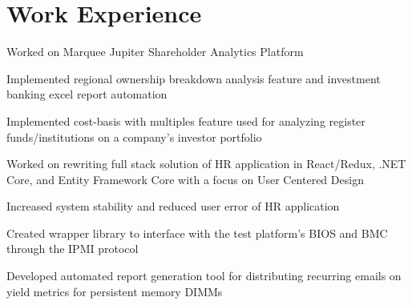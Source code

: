 \documentclass[]{deedy-resume-openfont}
\begin{document}
\hfill
\begin{minipage}[t]{0.66\textwidth} 


\section{Work Experience}

\sectionsep

\vspace{\topsep} %
\begin{tightemize}\item Worked on Marquee Jupiter Shareholder Analytics Platform \item Implemented regional ownership breakdown analysis feature and investment banking excel report automation \item Implemented cost-basis with multiples feature used for analyzing register funds/institutions on a company's investor portfolio 
\end{tightemize}
\sectionsep

\begin{tightemize}\item Worked on rewriting full stack solution of HR application in React/Redux, .NET Core, and Entity Framework Core with a focus on User Centered Design \item Increased system stability and reduced user error of HR application
\end{tightemize}
\sectionsep

\begin{tightemize}
\item Created wrapper library to interface with the test platform’s BIOS and BMC through the IPMI protocol \item Developed automated report generation tool for distributing recurring emails on yield metrics for persistent memory DIMMs\end{tightemize}
\sectionsep


\end{minipage}
\end{document}
